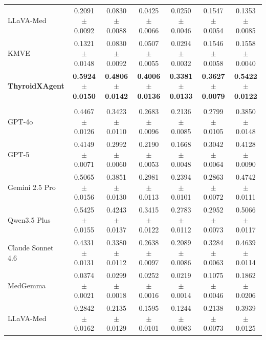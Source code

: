 \begin{table}[p]
\begin{threeparttable}
\begin{tabular}{lcccccc}
LLaVA-Med~\cite{li_llavamed_2023}
& 0.2091$\pm$0.0092
& 0.0830$\pm$0.0088
& 0.0425$\pm$0.0066
& 0.0250$\pm$0.0046
& 0.1547$\pm$0.0054
& 0.1353$\pm$0.0085 \\

KMVE~\cite{li_ultrasound_2024}
& 0.1321$\pm$0.0148
& 0.0830$\pm$0.0092
& 0.0507$\pm$0.0055
& 0.0294$\pm$0.0032
& 0.1546$\pm$0.0058
& 0.1558$\pm$0.0040 \\

\rowcolor{lightgray}
\textbf{ThyroidXAgent}
& \textbf{0.5924$\pm$0.0150}
& \textbf{0.4806$\pm$0.0142}
& \textbf{0.4006$\pm$0.0136}
& \textbf{0.3381$\pm$0.0133}
& \textbf{0.3627$\pm$0.0079}
& \textbf{0.5422$\pm$0.0122} \\

\midrule

\rowcolor{gray!20}
\multicolumn{7}{c}{\textbf{KMVE Testset} ($n=492$)} \\

GPT-4o~\cite{openai_gpt4_2024}
& 0.4467$\pm$0.0126
& 0.3423$\pm$0.0110
& 0.2683$\pm$0.0096
& 0.2136$\pm$0.0085
& 0.2799$\pm$0.0105
& 0.3850$\pm$0.0148 \\

GPT-5~\cite{openai2025gpt5systemcard}
& 0.4149$\pm$0.0071
& 0.2992$\pm$0.0060
& 0.2190$\pm$0.0053
& 0.1668$\pm$0.0048
& 0.3042$\pm$0.0064
& 0.4128$\pm$0.0090 \\

Gemini 2.5 Pro~\cite{comanici_gemini_2025}
& 0.5065$\pm$0.0156
& 0.3851$\pm$0.0130
& 0.2981$\pm$0.0113
& 0.2394$\pm$0.0101
& 0.2863$\pm$0.0072
& 0.4742$\pm$0.0111 \\

Qwen3.5 Plus~\cite{yang_qwen3_2025}
& 0.5425$\pm$0.0155
& 0.4243$\pm$0.0137
& 0.3415$\pm$0.0122
& 0.2783$\pm$0.0112
& 0.2952$\pm$0.0073
& 0.5066$\pm$0.0117 \\

Claude Sonnet 4.6
& 0.4331$\pm$0.0131
& 0.3380$\pm$0.0112
& 0.2638$\pm$0.0097
& 0.2089$\pm$0.0086
& 0.3284$\pm$0.0063
& 0.4639$\pm$0.0114 \\

MedGemma~\cite{sellergren2025medgemma}
& 0.0374$\pm$0.0021
& 0.0299$\pm$0.0018
& 0.0252$\pm$0.0016
& 0.0219$\pm$0.0014
& 0.1075$\pm$0.0046
& 0.1862$\pm$0.0206 \\

LLaVA-Med~\cite{li_llavamed_2023}
& 0.2842$\pm$0.0162
& 0.2135$\pm$0.0129
& 0.1595$\pm$0.0101
& 0.1244$\pm$0.0083
& 0.2138$\pm$0.0073
& 0.3939$\pm$0.0125 \\


\end{tabular}
\end{threeparttable}
\end{table}
